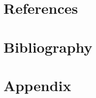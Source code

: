 \documentclass{article}
\begin{document}
\section*{References}

\section{Bibliography}
\printbibliography

\section{Appendix}
\end{document}
